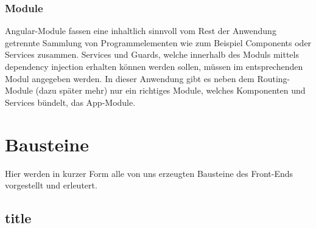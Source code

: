 \subsubsection{Module}
Angular-Module fassen eine inhaltlich sinnvoll vom Rest der Anwendung getrennte Sammlung von Programmelementen wie zum Beispiel Components oder Services zusammen. Services und Guards, welche innerhalb des Moduls mittels dependency injection erhalten können werden sollen, müssen im entsprechenden Modul angegeben werden. In dieser Anwendung gibt es neben dem Routing-Module (dazu später mehr) nur ein richtiges Module, welches Komponenten und Services bündelt, das App-Module.

\section{Bausteine}
Hier werden in kurzer Form alle von uns erzeugten Bausteine des Front-Ends vorgestellt und erleutert.

\subsection{title}




